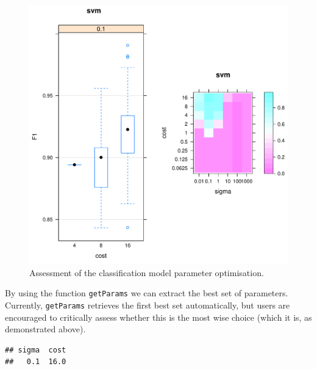 \begin{knitrout}
\color{fgcolor}\begin{kframe}
\begin{alltt}
\end{alltt}
\end{kframe}
\end{knitrout}

\begin{figure}[!ht]
  \centering
\begin{knitrout}
\color{fgcolor}
\includegraphics[width=.65\textwidth]{figure/visualiseOptHide-1} 

\end{knitrout}
  \caption{Assessment of the classification model parameter optimisation.}
  \label{fig:visualisOptHide}
\end{figure}


By using the function \texttt{getParams} we can extract the best set
of parameters. Currently, \texttt{getParams} retrieves the first best
set automatically, but users are encouraged to critically assess
whether this is the most wise choice (which it is, as demonstrated
above).

\begin{knitrout}
\color{fgcolor}\begin{kframe}
\begin{alltt}
 \hlkwb{<-} 
\end{alltt}
\begin{verbatim}
## sigma  cost 
##   0.1  16.0
\end{verbatim}
\end{kframe}
\end{knitrout}

